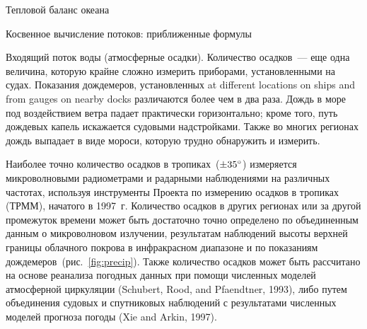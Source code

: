 \begin{chapter}{Тепловой баланс океана}
\begin{section}{Косвенное вычисление потоков: приближенные формулы}
\begin{paragraph}{Входящий поток воды (атмосферные осадки).}
Количество осадков~--- еще одна величина, которую крайне сложно измерить
приборами, установленными на судах. Показания дождемеров, установленных
at different locations on ships and from gauges on nearby docks
различаются более чем в два раза. Дождь в море под воздействием ветра 
падает практически горизонтально; кроме того, путь дождевых капель искажается
судовыми надстройками. Также во многих регионах дождь выпадает в виде
мороси, которую трудно обнаружить и измерить.
%

Наиболее точно количество осадков в тропиках~($\pm {35}^\circ$)
измеряется микроволновыми радиометрами и радарными наблюдениями на различных
частотах, используя инструменты Проекта по измерению осадков в тропиках (ТРММ),
начатого в 1997~г. Количество осадков в других регионах или за другой
промежуток времени может быть достаточно точно определено по объединенным
данным о микроволновом излучении, результатам наблюдений высоты верхней 
границы облачного покрова в инфракрасном диапазоне и по показаниям 
дождемеров~(рис.~\ref{fig:precip}). Также количество осадков может быть 
рассчитано на основе реанализа погодных данных при помощи численных моделей 
атмосферной циркуляции (Schubert, Rood, and Pfaendtner, 1993), 
либо путем объединения судовых и спутниковых наблюдений с результатами 
численных моделей прогноза погоды (Xie and Arkin, 1997).
%


\end{paragraph}
\end{section}
\end{chapter}
